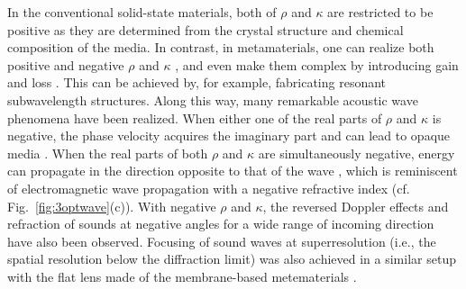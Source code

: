 \documentclass{tADP2e}
\theoremstyle{plain}
\theoremstyle{plain}
\theoremstyle{definition}
\begin{document}
In the conventional solid-state materials, both of $\rho$ and $\kappa$ are restricted to be positive as they are determined from the crystal structure and chemical composition of the media. 
In contrast, in metamaterials, one can realize both positive and negative $\rho$ and $\kappa$ \cite{ZS09,PCM11}, and even make them complex by introducing gain and loss \cite{FR15}.
This can be achieved by, for example, fabricating resonant subwavelength structures.
Along this way, many remarkable acoustic wave phenomena have been realized. 
When either one of the real parts of $\rho$ and $\kappa$ is negative, the phase velocity acquires the imaginary part and can lead to opaque media \cite{LZ00,FN06,YZ08,Lee_2009}. 
When the real parts of both $\rho$ and $\kappa$ are simultaneously negative,  energy can propagate in the direction opposite to that of the wave \cite{LZ12,XY13,LZ13}, which is reminiscent of electromagnetic wave propagation with a negative refractive index \cite{SRA01,SVM07} (cf. Fig.~\ref{fig:3optwave}(c)). With negative $\rho$ and $\kappa$, the reversed Doppler effects \cite{LSH10} and refraction of sounds at negative angles for a wide range of incoming direction \cite{CJ12,GCVM14} have also been observed.
Focusing of sound waves at superresolution (i.e., the spatial resolution below the diffraction limit) was also achieved in a similar setup with the flat lens made of the membrane-based metematerials \cite{PJJ15,KN15}.
 
\end{document}
